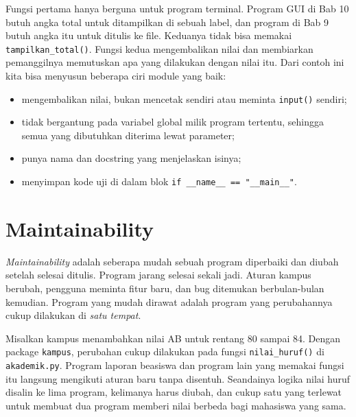 Fungsi pertama hanya berguna untuk program terminal. Program GUI di Bab 10 butuh angka total untuk ditampilkan di sebuah label, dan program di Bab 9 butuh angka itu untuk ditulis ke file. Keduanya tidak bisa memakai \texttt{tampilkan\_total()}. Fungsi kedua mengembalikan nilai dan membiarkan pemanggilnya memutuskan apa yang dilakukan dengan nilai itu. Dari contoh ini kita bisa menyusun beberapa ciri module yang baik:

\begin{itemize}
  \item mengembalikan nilai, bukan mencetak sendiri atau meminta \texttt{input()} sendiri;
  \item tidak bergantung pada variabel global milik program tertentu, sehingga semua yang dibutuhkan diterima lewat parameter;
  \item punya nama dan docstring yang menjelaskan isinya;
  \item menyimpan kode uji di dalam blok \texttt{if \_\_name\_\_ == "\_\_main\_\_"}.
\end{itemize}

\section{Maintainability}

\emph{Maintainability} adalah seberapa mudah sebuah program diperbaiki dan diubah setelah selesai ditulis. Program jarang selesai sekali jadi. Aturan kampus berubah, pengguna meminta fitur baru, dan bug ditemukan berbulan-bulan kemudian. Program yang mudah dirawat adalah program yang perubahannya cukup dilakukan di \emph{satu tempat}.

Misalkan kampus menambahkan nilai AB untuk rentang 80 sampai 84. Dengan package \texttt{kampus}, perubahan cukup dilakukan pada fungsi \texttt{nilai\_huruf()} di \texttt{akademik.py}. Program laporan beasiswa dan program lain yang memakai fungsi itu langsung mengikuti aturan baru tanpa disentuh. Seandainya logika nilai huruf disalin ke lima program, kelimanya harus diubah, dan cukup satu yang terlewat untuk membuat dua program memberi nilai berbeda bagi mahasiswa yang sama.

